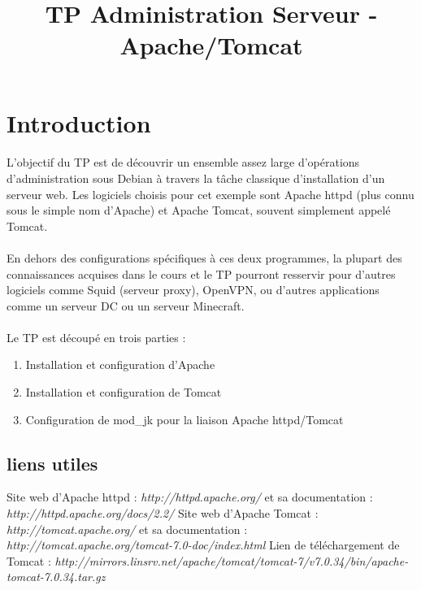 \documentclass[12pt,a4paper]{article}
\title{TP Administration Serveur - Apache/Tomcat}
\begin{document}
\maketitle{}

\section{Introduction}
\paragraph{}
L'objectif du TP est de découvrir un ensemble assez large d'opérations d'administration sous Debian à travers la tâche classique d'installation d'un serveur web. Les logiciels choisis pour cet exemple sont Apache httpd (plus connu sous le simple nom d'Apache) et Apache Tomcat, souvent simplement appelé Tomcat.

\paragraph{}
En dehors des configurations spécifiques à ces deux programmes, la plupart des connaissances acquises dans le cours et le TP pourront resservir pour d'autres logiciels comme Squid (serveur proxy), OpenVPN, ou d'autres applications comme un serveur DC ou un serveur Minecraft.

\paragraph{}
Le TP est découpé en trois parties : 
\begin{enumerate}
    \item Installation et configuration d'Apache
    \item Installation et configuration de Tomcat
    \item Configuration de mod\_jk pour la liaison Apache httpd/Tomcat
\end{enumerate}

\subsection{liens utiles}
    
Site web d'Apache httpd : \textit{http://httpd.apache.org/} et sa documentation : \textit{http://httpd.apache.org/docs/2.2/}
Site web d'Apache Tomcat : \textit{http://tomcat.apache.org/} et sa documentation : \textit{http://tomcat.apache.org/tomcat-7.0-doc/index.html}
Lien de téléchargement de Tomcat : \textit{http://mirrors.linsrv.net/apache/tomcat/tomcat-7/v7.0.34/bin/apache-tomcat-7.0.34.tar.gz}
\end{document}

